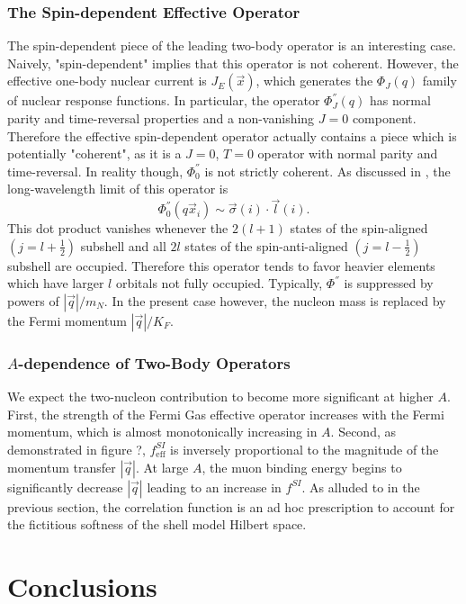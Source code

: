 \documentclass{book}[12pt]
\begin{document}
\subsection{The Spin-dependent Effective Operator}
The spin-dependent piece of the leading two-body operator is an interesting case. Naively, "spin-dependent" implies that this operator is not coherent. However, the effective one-body nuclear current is $J_E(\vec{x})$, which generates the $\Phi_J(q)$ family of nuclear response functions. In particular, the operator $\Phi^{''}_J(q)$ has normal parity and time-reversal properties and a non-vanishing $J=0$ component. Therefore the effective spin-dependent operator actually contains a piece which is potentially "coherent", as it is a $J=0$, $T=0$ operator with normal parity and time-reversal. In reality though, $\Phi^{''}_0$ is not strictly coherent. As discussed in \citep{Fitzpatrick_2013}, the long-wavelength limit of this operator is
\begin{equation}
\Phi^{''}_0(q\vec{x}_i)\sim \vec{\sigma}(i)\cdot\vec{l}(i).
\end{equation}
This dot product vanishes whenever the $2(l+1)$ states of the spin-aligned $\left(j=l+\frac{1}{2}\right)$ subshell and all $2l$ states of the spin-anti-aligned $\left(j=l-\frac{1}{2}\right)$ subshell are occupied. Therefore this operator tends to favor heavier elements which have larger $l$ orbitals not fully occupied. Typically, $\Phi^{''}$ is suppressed by powers of $|\vec{q}|/m_N$. In the present case however, the nucleon mass is replaced by the Fermi momentum $|\vec{q}|/K_F$.
\subsection{$A$-dependence of Two-Body Operators}

We expect the two-nucleon contribution to become more significant at higher $A$. First, the strength of the Fermi Gas effective operator increases with the Fermi momentum, which is almost monotonically increasing in $A$. Second, as demonstrated in figure ?, $f^{SI}_\mathrm{eff}$ is inversely proportional to the magnitude of the momentum transfer $|\vec{q}|$. At large $A$, the muon binding energy begins to significantly decrease $|\vec{q}|$ leading to an increase in $f^{SI}$.
As alluded to in the previous section, the correlation function is an ad hoc prescription to account for the fictitious softness of the shell model Hilbert space.

\chapter{Conclusions}
\end{document}
